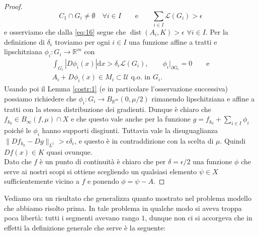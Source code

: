 \documentclass[a4paper,11pt]{book}
\theoremstyle{plain}
\theoremstyle{definition}
\theoremstyle{remark}
\newcommand{\R}{\mathbb{R}}
\newcommand{\LL}{\mathscr{L}}
\newcommand{\norm}[1]{\lVert#1\rVert}
\newcommand{\dx}{\text{d}x}
\DeclareMathOperator{\dist}{dist}
\begin{document}
\begin{proof}
    \[
        C_1\cap G_i\neq\emptyset\quad\forall i\in I \qquad\text{e}\qquad\sum_{i\in I}\LL(G_i)>\epsilon
    \]
    e osserviamo che dalla \eqref{eq:16} segue che $\dist(A_i,K)>\epsilon$ $\forall i\in I$.
    Per la definizione di $\delta_{\epsilon}$ troviamo per ogni $i\in I$ una funzione affine a tratti e lipschitziana $\phi_i:G_i\to \R^m$ con
    \begin{gather*}
        \int_{G_i}|D\phi_i(x)|\dx>\delta_{\epsilon}\LL(G_i),\qquad\phi_i|_{\partial G_i}=0\qquad\text{e}\\
        A_i+D\phi_i(x)\in M_i\subset \mathcal{U}\text{ q.o. in }G_i.
    \end{gather*}
    Usando poi il Lemma \ref{costr:1} (e in particolare l'osservazione successiva) possiamo richiedere che $\phi_i:G_i\to B_{\R^m}(0,\mu/2)$ rimanendo lipschitziana e affine a tratti con la stessa distribuzione dei gradienti. Dunque è chiaro che $f_{k_0}\in B_{\infty}(f,\mu)\cap X$ e che questo vale anche per la funzione $g=f_{k_0}+\sum_{i\in I}\phi_i$ poiché le $\phi_i$ hanno supporti disgiunti. Tuttavia vale la disuguaglianza $\norm{Df_{k_0}-Dg}_{L^1}>\epsilon\delta_{\epsilon}$, e questo è in contraddizione con la scelta di $\mu$. Quindi $Df(x)\in K$ quasi ovunque.\\
    Dato che $f$ è un punto di continuità è chiaro che per $\delta=\epsilon/2$ una funzione $\phi$ che serve ai nostri scopi si ottiene scegliendo un qualsiasi elemento $\psi\in X$ sufficientemente vicino a $f$ e ponendo $\phi=\psi-A$.
\end{proof}

Vediamo ora un risultato che generalizza quanto mostrato nel problema modello che abbiamo risolto prima. In tale problema in qualche modo si aveva troppa poca libertà: tutti i segmenti avevano rango $1$, dunque non ci si accorgeva che in effetti la definizione generale che serve è la seguente:
\end{document}
